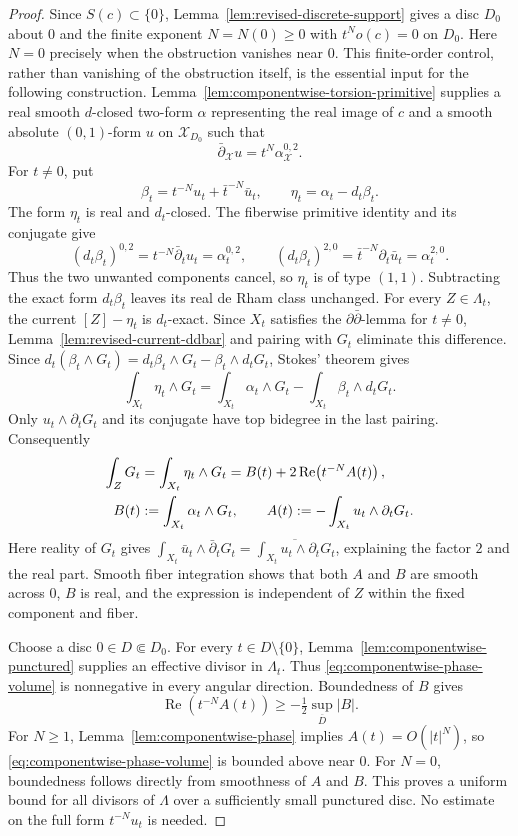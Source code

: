 \documentclass[11pt]{amsart}
\numberwithin{equation}{section}
\theoremstyle{plain}
\theoremstyle{definition}
\newcommand{\cX}{\mathcal X}
\begin{document}
\begin{proof}
Since $S(c)\subset\{0\}$, Lemma~\ref{lem:revised-discrete-support}
gives a disc $D_0$ about $0$ and the finite exponent $N=N(0)\ge0$
with $t^No(c)=0$ on $D_0$.  Here $N=0$ precisely when the obstruction
vanishes near $0$.  This finite-order control, rather than vanishing
of the obstruction itself, is the essential input for the following
construction.
Lemma~\ref{lem:componentwise-torsion-primitive} supplies a real
smooth $d$-closed two-form $\alpha$
representing the real image of $c$ and a smooth absolute $(0,1)$-form
$u$ on $\cX_{D_0}$ such that
\[
 \bar\partial_{\cX}u=t^N\alpha^{0,2}_{\cX}.
\]
For $t\ne0$, put
\[
 \beta_t=t^{-N}u_t+\bar t^{-N}\bar u_t,
 \qquad \eta_t=\alpha_t-d_t\beta_t.
\]
The form $\eta_t$ is real and $d_t$-closed.  The fiberwise primitive
identity and its conjugate give
\[
 (d_t\beta_t)^{0,2}=t^{-N}\bar\partial_tu_t=\alpha_t^{0,2},
 \qquad
 (d_t\beta_t)^{2,0}=\bar t^{-N}\partial_t\bar u_t=\alpha_t^{2,0}.
\]
Thus the two unwanted components cancel, so $\eta_t$ is of type
$(1,1)$.  Subtracting the exact form $d_t\beta_t$ leaves its real
de Rham class unchanged.
For every $Z\in\Lambda_t$, the current $[Z]-\eta_t$ is $d_t$-exact.
Since $X_t$ satisfies the $\partial\bar\partial$-lemma for $t\ne0$,
Lemma~\ref{lem:revised-current-ddbar} and pairing with $G_t$ eliminate this
difference.  Since
$d_t(\beta_t\wedge G_t)=d_t\beta_t\wedge G_t-\beta_t\wedge d_tG_t$,
Stokes' theorem gives
\[
 \int_{X_t}\eta_t\wedge G_t
 =\int_{X_t}\alpha_t\wedge G_t-\int_{X_t}\beta_t\wedge d_tG_t.
\]
Only $u_t\wedge\partial_tG_t$ and its conjugate have top bidegree
in the last pairing.  Consequently
\begin{align}
 \int_ZG_t
 &=\int_{X_t}\eta_t\wedge G_t
   =B(t)+2\operatorname{Re}\!\left(t^{-N}A(t)\right),
   \label{eq:componentwise-phase-volume}\\
 B(t)&:=\int_{X_t}\alpha_t\wedge G_t,
 \qquad A(t):=-\int_{X_t}u_t\wedge\partial_tG_t.
 \notag
\end{align}
Here reality of $G_t$ gives
$\int_{X_t}\bar u_t\wedge\bar\partial_tG_t
=\overline{\int_{X_t}u_t\wedge\partial_tG_t}$, explaining the
factor $2$ and the real part.  Smooth fiber integration shows that
both $A$ and $B$ are smooth across $0$,
$B$ is real, and the expression is independent of $Z$ within the
fixed component and fiber.

Choose a disc $0\in D\Subset D_0$.  For every $t\in D\setminus\{0\}$,
Lemma~\ref{lem:componentwise-punctured} supplies an effective divisor
in $\Lambda_t$.  Thus \eqref{eq:componentwise-phase-volume} is
nonnegative in every angular direction.  Boundedness of $B$ gives
\[
 \operatorname{Re}\!\left(t^{-N}A(t)\right)
 \ge -\tfrac12\sup_{\overline D}|B|.
\]
For $N\ge1$, Lemma~\ref{lem:componentwise-phase} implies $A(t)=O(|t|^N)$,
so \eqref{eq:componentwise-phase-volume} is bounded above near $0$.
For $N=0$, boundedness follows directly from smoothness of $A$ and
$B$.  This proves a uniform bound for all divisors of $\Lambda$
over a sufficiently small punctured disc.  No estimate on the full
form $t^{-N}u_t$ is needed.


\end{proof}
\end{document}
